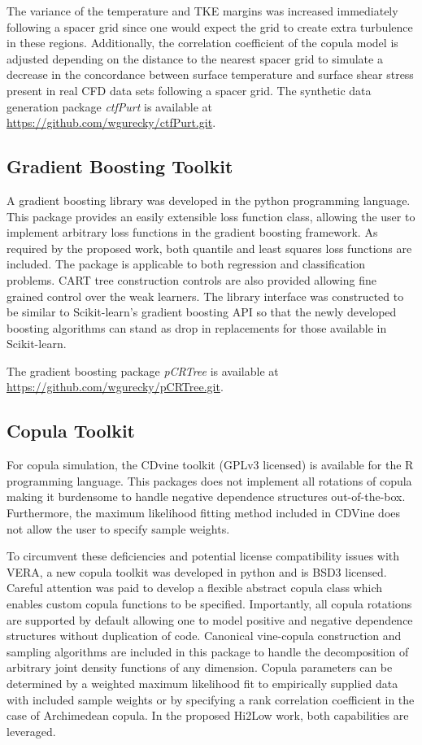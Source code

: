 The variance of the temperature and TKE margins was increased immediately following a spacer grid since one would expect the grid to create extra turbulence in these regions.  Additionally, the correlation coefficient of the copula model is adjusted depending on the distance to the nearest spacer grid to simulate a decrease in the concordance between surface temperature and surface shear stress present in real CFD data sets following a spacer grid. 
The synthetic data generation package \emph{ctfPurt} is available at \url{https://github.com/wgurecky/ctfPurt.git}.

\subsection{Gradient Boosting Toolkit}

A gradient boosting library was developed in the python programming language.  This package provides an easily extensible loss function class, allowing the user to implement arbitrary loss functions in the gradient boosting framework.  As required by the proposed work, both quantile and least squares loss functions are included.  The package is applicable to both regression and classification problems.  CART tree construction controls are also provided allowing fine grained control over the weak learners.
The library interface was constructed to be similar to Scikit-learn's gradient boosting API so that the newly developed boosting algorithms can stand as drop in replacements for those available in Scikit-learn.

The gradient boosting package \emph{pCRTree} is available at \url{https://github.com/wgurecky/pCRTree.git}.

\subsection{Copula Toolkit}

For copula simulation, the CDvine toolkit (GPLv3 licensed) is available for the R programming language. This packages does not implement all rotations of copula making it burdensome to handle negative dependence structures out-of-the-box.  Furthermore, the maximum likelihood fitting method included in CDVine does not allow the user to specify sample weights.

To circumvent these deficiencies and potential license compatibility issues with VERA, a new copula toolkit was developed in python and is BSD3 licensed.
Careful attention was paid to develop a flexible abstract copula class which enables custom copula functions to be specified.  Importantly, all copula rotations are supported by default allowing one to model positive and negative dependence structures without duplication of code.
Canonical vine-copula construction and sampling algorithms are included in this package to handle the decomposition of arbitrary joint density functions of any dimension.
Copula parameters can be determined by a weighted maximum likelihood fit to empirically supplied data with included sample weights or by specifying a rank correlation coefficient in the case of Archimedean copula.  In the proposed Hi2Low work, both capabilities are leveraged.


